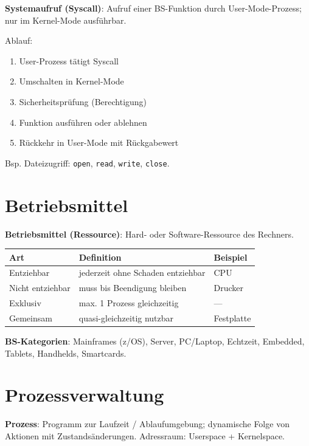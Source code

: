 \documentclass[11pt, a4paper]{article}
\begin{document}
\textbf{Systemaufruf (Syscall)}: Aufruf einer BS-Funktion durch User-Mode-Prozess; nur im Kernel-Mode ausführbar.


Ablauf:

\begin{enumerate}
  \item User-Prozess tätigt Syscall
  \item Umschalten in Kernel-Mode
  \item Sicherheitsprüfung (Berechtigung)
  \item Funktion ausführen oder ablehnen
  \item Rückkehr in User-Mode mit Rückgabewert
\end{enumerate}

Bsp. Dateizugriff: \texttt{open}, \texttt{read}, \texttt{write}, \texttt{close}.



\section{Betriebsmittel}

\textbf{Betriebsmittel (Ressource)}: Hard- oder Software-Ressource des Rechners.



{\small
\begin{tabularx}{\linewidth}{XXX}
\hline
\rowcolor{tableheadbg}
{\color{white}\textbf{Art}} & {\color{white}\textbf{Definition}} & {\color{white}\textbf{Beispiel}} \\[2pt]
\hline
\endhead
\hline
\endfoot
Entziehbar & jederzeit ohne Schaden entziehbar & CPU \\
Nicht entziehbar & muss bis Beendigung bleiben & Drucker \\
Exklusiv & max. 1 Prozess gleichzeitig & — \\
Gemeinsam & quasi-gleichzeitig nutzbar & Festplatte \\
\end{tabularx}
}


\textbf{BS-Kategorien}: Mainframes (z/OS), Server, PC/Laptop, Echtzeit, Embedded, Tablets, Handhelds, Smartcards.



\section{Prozessverwaltung}

\textbf{Prozess}: Programm zur Laufzeit / Ablaufumgebung; dynamische Folge von Aktionen mit Zustandsänderungen. Adressraum: Userspace + Kernelspace.
\end{document}
